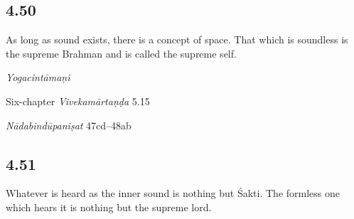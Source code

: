 \begin{ekdosis}
\begin{philcomm}[hp04_049]
\end{philcomm}

\subsection*{4.50}
\begin{translation}[hp04_050]
As long as sound exists, there is a concept of space. That which is soundless is the supreme Brahman and is called the supreme self.
\end{translation}


\begin{testimonia}[hp04_050]
\emph{Yogacintāmaṇi}
\begin{versinnote}
\end{versinnote}

Six-chapter \emph{Vivekamārtaṇḍa} 5.15
\begin{versinnote}
\end{versinnote}

\emph{Nādabindūpaniṣat} 47cd–48ab
\begin{versinnote}
\end{versinnote}
\end{testimonia}


\subsection*{4.51}
\begin{translation}[hp04_051]
Whatever is heard as the inner sound is nothing but Śakti. The formless one which hears it is nothing but the supreme lord.
\end{translation}



\end{ekdosis}
